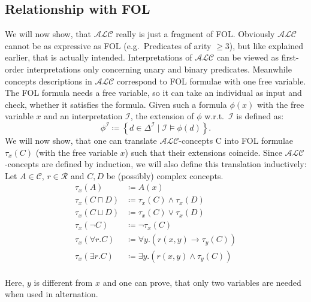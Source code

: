
\subsection{Relationship with FOL}
We will now show, that $\mathcal{ALC}$ really is just a fragment of FOL.
Obviously $\mathcal{ALC}$ cannot be as expressive as FOL (e.g.\ Predicates of arity $ \geq 3$), but like explained earlier, that is actually intended.
\newline
Interpretations of $\mathcal{ALC}$ can be viewed as first-order interpretations only concerning unary and binary predicates.
Meanwhile concepts descriptions in $\mathcal{ALC}$ correspond to FOL formulae with one free variable. 
The FOL formula needs a free variable, so it can take an individual as input and check, whether it satisfies the formula.
\newline
Given such a formula $\phi (x)$ with the free variable $x$ and an interpretation $\mathcal{I}$, the extension of $\phi$ w.r.t.\ $\mathcal{I}$ is defined as:
\[
	\phi ^{\mathcal{I}} \coloneqq \left\{ d \in \Delta ^{\mathcal{I}} \mid \mathcal{I} \vDash \phi (d) \right\} 
.\]
We will now show, that one can translate $\mathcal{ALC}$-concepts C into FOL formulae $\tau_{x}(C)$ (with the free variable $x$) such that their extensions coincide.
Since $\mathcal{ALC}$-concepts are defined by induction, we will also define this translation inductively:
Let $A \in \mathscr{C}$, $r \in \mathscr{R}$ and $C, D$ be (possibly) complex concepts.
\begin{align*}
	\tau_{x}(A) &\coloneqq A(x) \\
	\tau_{x} \left( C \sqcap D \right) &\coloneqq \tau_{x}(C) \land \tau_{x}(D) \\
	\tau_{x} \left( C \sqcup D \right) &\coloneqq \tau_{x}(C) \lor \tau_{x}(D) \\
	\tau_{x} (\neg C) &\coloneqq \neg \tau_{x}(C) \\
	\tau_{x} \left( \forall r.C \right) &\coloneqq \forall y.(r(x,y) \rightarrow \tau_{y}(C)) \\
	\tau_{x} \left( \exists r.C \right) &\coloneqq \exists y.(r(x,y) \land \tau_{y}(C)) \\
\end{align*}

\begin{note}
Here, $y$ is different from $x$ and one can prove, that only two variables are needed when used in alternation.
\end{note}

